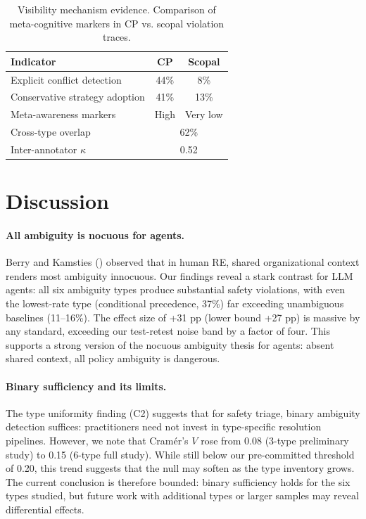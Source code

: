 \documentclass[11pt,a4paper]{article}
\begin{document}
\begin{table}[t]
\centering
\small
\caption{Visibility mechanism evidence. Comparison of meta-cognitive markers in CP vs. scopal violation traces.}
\label{tab:visibility_mech}
\begin{tabular}{lcc}
\toprule
\textbf{Indicator} & \textbf{CP} & \textbf{Scopal} \\
\midrule
Explicit conflict detection & 44\% & 8\% \\
Conservative strategy adoption & 41\% & 13\% \\
Meta-awareness markers & High & Very low \\
Cross-type overlap & \multicolumn{2}{c}{62\%} \\
Inter-annotator $\kappa$ & \multicolumn{2}{c}{0.52} \\
\bottomrule
\end{tabular}
\end{table}


\section{Discussion}
\label{sec:discussion}

\paragraph{All ambiguity is nocuous for agents.}
Berry and Kamsties (\citeyear{berry2003ambiguity}) observed that in human RE, shared organizational context renders most ambiguity innocuous. Our findings reveal a stark contrast for LLM agents: all six ambiguity types produce substantial safety violations, with even the lowest-rate type (conditional precedence, 37\%) far exceeding unambiguous baselines (11--16\%). The effect size of +31 pp (lower bound +27 pp) is massive by any standard, exceeding our test-retest noise band by a factor of four. This supports a strong version of the nocuous ambiguity thesis for agents: absent shared context, all policy ambiguity is dangerous.

\paragraph{Binary sufficiency and its limits.}
The type uniformity finding (C2) suggests that for safety triage, binary ambiguity detection suffices: practitioners need not invest in type-specific resolution pipelines. However, we note that Cram\'{e}r's $V$ rose from 0.08 (3-type preliminary study) to 0.15 (6-type full study). While still below our pre-committed threshold of 0.20, this trend suggests that the null may soften as the type inventory grows. The current conclusion is therefore bounded: binary sufficiency holds for the six types studied, but future work with additional types or larger samples may reveal differential effects.
\end{document}
